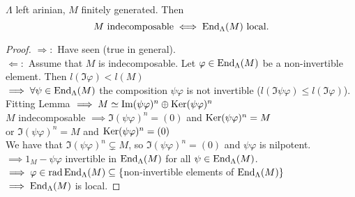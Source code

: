 \begin{thm}\label{thm:42}
$\Lambda$ left arinian, $M$ finitely generated. Then \[M \text{ indecomposable} \iff \operatorname{End}_\Lambda(M) \text{ local.}\]
\end{thm}
\begin{proof}
\underline{$\Rightarrow:$} Have seen (true in general).\\
\underline{$\Leftarrow:$} Assume that $M$ is indecomposable. Let $\varphi \in \operatorname{End}_\Lambda(M)$ be a non-invertible element. Then $l(\Im \varphi) < l(M)$\\
$\implies \forall \psi \in \operatorname{End}_\Lambda(M)$ the composition $\psi\varphi$ is not invertible ($l(\Im \psi\varphi) \leq l(\Im \varphi)$).\\
Fitting Lemma $\implies M \simeq \operatorname{Im}\nolimits (\psi\varphi)^n \oplus \operatorname{Ker}\nolimits (\psi\varphi)^n$\\
$M$ indecomposable $\implies \Im (\psi \varphi)^n = (0)$ and $\operatorname{Ker}\nolimits (\psi \varphi)^n = M$\\
or $\Im (\psi \varphi)^n = M$ and $\operatorname{Ker}\nolimits (\psi \varphi)^n = (0)$\\
We have that $\Im (\psi \varphi)^n \subsetneq M$, so $\Im (\psi \varphi)^n = (0)$ and $\psi\varphi$ is nilpotent.\\
$\implies 1_M - \psi\varphi$ invertible in $\operatorname{End}_\Lambda(M)$ for all $\psi \in \operatorname{End}_\Lambda(M)$.\\
$\implies \varphi \in \operatorname{rad}\nolimits \operatorname{End}_\Lambda(M) \subseteq \{ $non-invertible elements of $\operatorname{End}_\Lambda(M) \}$\\
$\implies \operatorname{End}_\Lambda(M)$ is local.
\end{proof}


